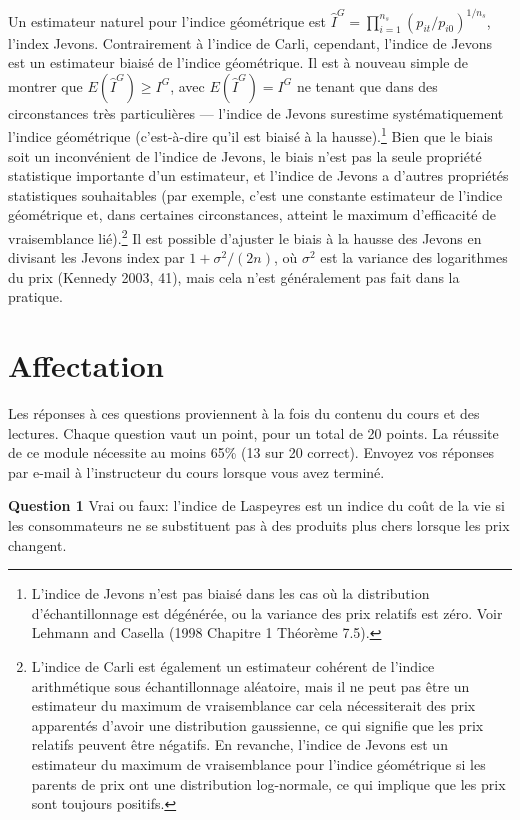 \documentclass[]{article}
\begin{document}
Un estimateur naturel pour l'indice géométrique est \(\hat{I}^{G} = \prod_{i = 1}^{n_{s}} (p_{it} / p_{i0})^{1 / n_{s}}\), l'index Jevons. Contrairement à l'indice de Carli, cependant, l'indice de Jevons est un estimateur biaisé de l'indice géométrique. Il est à nouveau simple de montrer que \(E(\hat{I}^{G}) \geq I^{G}\), avec \(E(\hat{I}^{G}) = I^{G}\) ne tenant que dans des circonstances très particulières --- l'indice de Jevons surestime systématiquement l'indice géométrique (c'est-à-dire qu'il est biaisé à la hausse).\footnote{L'indice de Jevons n'est pas biaisé dans les cas où la distribution d'échantillonnage est dégénérée, ou la variance des prix relatifs est zéro. Voir Lehmann and Casella (1998 Chapitre 1 Théorème 7.5).} Bien que le biais soit un inconvénient de l'indice de Jevons, le biais n'est pas la seule propriété statistique importante d'un estimateur, et l'indice de Jevons a d'autres propriétés statistiques souhaitables (par exemple, c'est une constante estimateur de l'indice géométrique et, dans certaines circonstances, atteint le maximum d'efficacité de vraisemblance lié).\footnote{L'indice de Carli est également un estimateur cohérent de l'indice arithmétique sous échantillonnage aléatoire, mais il ne peut pas être un estimateur du maximum de vraisemblance car cela nécessiterait des prix apparentés d'avoir une distribution gaussienne, ce qui signifie que les prix relatifs peuvent être négatifs. En revanche, l'indice de Jevons est un estimateur du maximum de vraisemblance pour l'indice géométrique si les parents de prix ont une distribution log-normale, ce qui implique que les prix sont toujours positifs.} Il est possible d'ajuster le biais à la hausse des Jevons en divisant les Jevons index par \(1 + \sigma^{2} / (2n)\), où \(\sigma^{2}\) est la variance des logarithmes du prix (Kennedy 2003, 41), mais cela n'est généralement pas fait dans la pratique.

\hypertarget{affectation-1}{%
\section{Affectation}\label{affectation-1}}

Les réponses à ces questions proviennent à la fois du contenu du cours et des lectures. Chaque question vaut un point, pour un total de 20 points. La réussite de ce module nécessite au moins 65\% (13 sur 20 correct). Envoyez vos réponses par e-mail à l'instructeur du cours lorsque vous avez terminé.

\textbf{Question 1} Vrai ou faux: l'indice de Laspeyres est un indice du coût de la vie si les consommateurs ne se substituent pas à des produits plus chers lorsque les prix changent.
\end{document}
